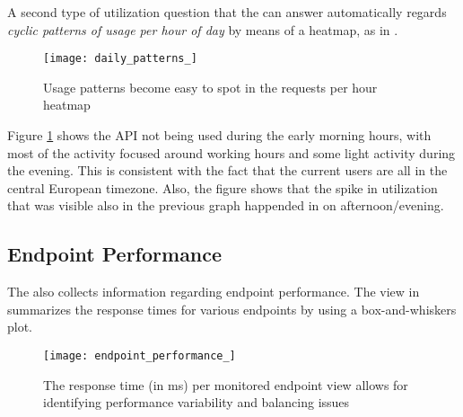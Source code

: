 \documentclass{sig-alternate-05-2015}
\begin{document}
\niceseparator


A second type of utilization question that the \tool can answer automatically regards {\em cyclic patterns of usage per hour of day} by means of a heatmap, as in . 


\begin{figure}[!ht]
	\centering
	\texttt{[image: daily\_patterns\_]}
	\caption{Usage patterns become easy to spot in the requests per hour heatmap}
	\label{fig:dp}
\end{figure}


Figure \ref{fig:dp} shows the API not being used during the early morning hours, with most of the activity focused around working hours and some light activity during the evening. This is consistent with the fact that the current users are all in the central European timezone. Also, the figure shows that the spike in utilization that was visible also in the previous graph happended in on afternoon/evening.

\subsection{Endpoint Performance}
\label{sec:perf}

  The \tool also collects information regarding endpoint performance. The view in  summarizes the response times for various endpoints by using a box-and-whiskers plot. 


  \begin{figure}[!ht]
    \centering
    \texttt{[image: endpoint\_performance\_]}
    \caption{The response time (in ms) per monitored endpoint view allows for identifying performance variability and balancing issues}
    \label{fig:ep}
  \end{figure}
\end{document}
